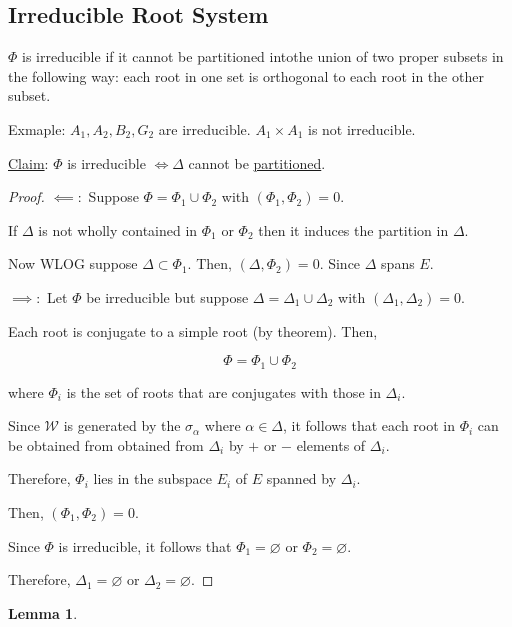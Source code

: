 \documentclass{article}
\theoremstyle{definition}
\newtheorem{lemma}[theorem]{Lemma}
\begin{document}
\subsection*{Irreducible Root System}

\(\Phi\) is irreducible if it cannot be partitioned intothe union of two proper subsets in the following way: each root in one set is orthogonal to each root in the other subset.

Exmaple: \(A_1, A_2, B_2, G_2\) are irreducible. \(A_1 \times A_1\) is not irreducible.

\underline{Claim}: \(\Phi\) is irreducible \(\iff \Delta\) cannot be \underline{partitioned}.

\begin{proof}
    \(\impliedby:\) Suppose \(\Phi = \Phi_1 \cup \Phi_2\) with \((\Phi_1, \Phi_2) = 0\).

    If \(\Delta\) is not wholly contained in \(\Phi_1\) or \(\Phi_2\) then it induces the partition in \(\Delta\). 

    Now WLOG suppose \(\Delta \subset \Phi_1\). Then, \((\Delta , \Phi_2) = 0\). Since \(\Delta\) spans \(E\).

    \(\implies:\) Let \(\Phi\) be irreducible but suppose \(\Delta = \Delta_1 \cup \Delta_2\) with \((\Delta_1, \Delta_2) = 0\).

    Each root is conjugate to a simple root (by theorem). Then,

    \[
        \Phi = \Phi_1 \cup \Phi_2
    \]

    where \(\Phi_i\) is the set of roots that are conjugates with those in \(\Delta_i\).

    Since \(\mathcal{W}\) is generated by the \(\sigma_\alpha\) where \(\alpha \in \Delta\), it follows that each root in \(\Phi_i\) can be obtained from obtained from \(\Delta_i\) by \(+\) or \(-\) elements of \(\Delta_i\).

    Therefore, \(\Phi_i\) lies in the subspace \(E_i\) of \(E\) spanned by \(\Delta_i\).

    Then, \((\Phi_1, \Phi_2) = 0\).
    
    Since \(\Phi\) is irreducible, it follows that \(\Phi_1 = \varnothing \) or \(\Phi_2 = \varnothing \).

    Therefore, \(\Delta_1 = \varnothing\) or \(\Delta_2 = \varnothing\).

\end{proof}

\begin{lemma}
    
\end{lemma}
\end{document}
